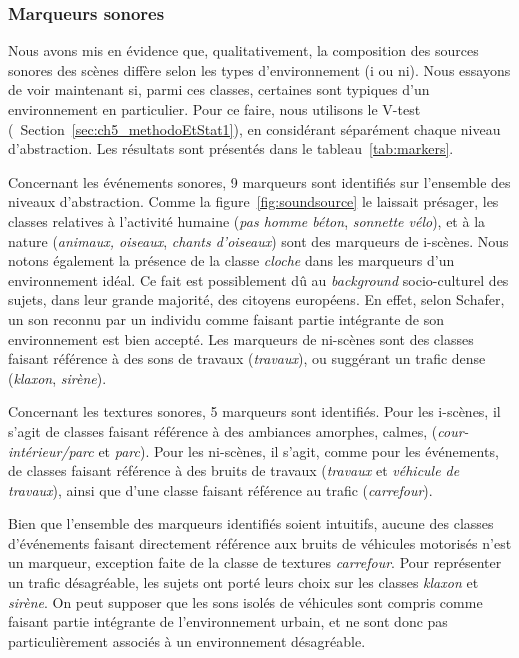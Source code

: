 \subsubsection{Marqueurs sonores}
\label{sec:ch5_marqueurXp1}

Nous avons mis en évidence que, qualitativement, la composition des sources sonores des scènes diffère selon les types d'environnement (i ou ni). Nous essayons de voir maintenant si, parmi ces classes, certaines sont typiques d'un environnement en particulier. Pour ce faire, nous utilisons le V-test (\cf~Section~\ref{sec:ch5_methodoEtStat1}), en considérant séparément chaque niveau d'abstraction. Les résultats sont présentés dans le tableau~\ref{tab:markers}.

Concernant les événements sonores, 9 marqueurs sont identifiés sur l'ensemble des niveaux d'abstraction. Comme la figure~\ref{fig:soundsource} le laissait présager, les classes relatives à l'activité humaine (\emph{pas homme béton}, \emph{sonnette vélo}), et à la nature (\emph{animaux, oiseaux}, \emph{chants d'oiseaux}) sont des marqueurs de i-scènes. Nous notons également la présence de la classe \emph{cloche} dans les marqueurs d'un environnement idéal. Ce fait est possiblement dû au \emph{background} socio-culturel des sujets, dans leur grande majorité, des citoyens européens. En effet, selon Schafer, un son reconnu par un individu comme faisant partie intégrante de son environnement est bien accepté. Les marqueurs de ni-scènes sont des classes faisant référence à des sons de travaux (\emph{travaux}), ou suggérant un trafic dense (\emph{klaxon}, \emph{sirène}).

Concernant les textures sonores, 5 marqueurs sont identifiés. Pour les i-scènes, il s'agit de classes faisant référence à des ambiances amorphes, calmes, (\emph{cour-intérieur/parc} et \emph{parc}). Pour les ni-scènes, il s'agit, comme pour les événements, de classes faisant référence à des bruits de travaux (\emph{travaux} et \emph{véhicule de travaux}), ainsi que d'une classe faisant référence au trafic (\emph{carrefour}).

Bien que l'ensemble des marqueurs identifiés soient intuitifs, aucune des classes d'événements faisant directement référence aux bruits de véhicules motorisés n'est un marqueur, exception faite de la classe de textures \emph{carrefour}. Pour représenter un trafic désagréable, les sujets ont porté leurs choix sur les classes \emph{klaxon} et \emph{sirène}. On peut supposer que les sons isolés de véhicules sont compris comme faisant partie intégrante de l'environnement urbain, et ne sont donc pas particulièrement associés à un environnement désagréable. \\ 

